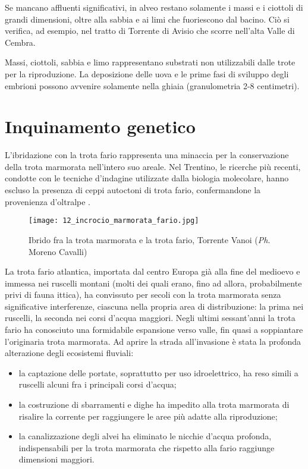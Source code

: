\documentclass[10pt,twoside,openany,x11names,svgnames,italian,a5paper,dvipsnames,table]{memoir}
\newcommand{\ph}{\emph{Ph}. }
\begin{document}
Se mancano affluenti significativi, in alveo restano solamente i massi e i ciottoli di grandi dimensioni, oltre alla sabbia e ai limi che fuoriescono dal bacino. Ciò si verifica, ad esempio, nel tratto di Torrente di Avisio che scorre nell’alta Valle di Cembra.


Massi, ciottoli, sabbia e limo rappresentano substrati non utilizzabili dalle trote per la riproduzione. La deposizione delle uova e le prime fasi di sviluppo degli embrioni possono avvenire solamente nella ghiaia (granulometria 2-8 centimetri).

\section{Inquinamento genetico}
L’ibridazione con la trota fario rappresenta una minaccia per la conservazione della trota marmorata nell’intero suo areale. Nel Trentino, le ricerche più recenti, condotte con le tecniche d’indagine utilizzate dalla biologia molecolare, hanno escluso la presenza di ceppi autoctoni di trota fario, confermandone la provenienza d’oltralpe \cite{Gandolfi91}.

\begin{wrapfigure}[15]{l}{.6\textwidth}
\begin{center}
\vspace{-.6cm}
\texttt{[image: 12\_incrocio\_marmorata\_fario.jpg]}
\caption*{Ibrido fra la trota marmorata e la trota fario, Torrente Vanoi (\ph Moreno Cavalli)}
\end{center}
\end{wrapfigure}

La trota fario atlantica, importata dal centro Europa già alla fine del medioevo e immessa nei ruscelli montani (molti dei quali erano, fino ad allora, probabilmente privi di fauna ittica), ha convissuto per secoli con la trota marmorata senza significative interferenze, ciascuna nella propria area di distribuzione: la prima nei ruscelli, la seconda nei corsi d’acqua maggiori. Negli ultimi sessant’anni la trota fario ha conosciuto una formidabile espansione verso valle, fin quasi a soppiantare l’originaria trota marmorata. 
Ad aprire la strada all'invasione è stata la profonda alterazione degli ecosistemi fluviali:
\begin{itemize}\itemsep0pt
  \item la captazione delle portate, soprattutto per uso idroelettrico, ha reso simili a ruscelli alcuni fra i principali corsi d’acqua; 
  \item la costruzione di sbarramenti e dighe ha impedito alla trota marmorata di risalire la corrente per raggiungere le aree più adatte alla riproduzione; 
  \item la canalizzazione degli alvei ha eliminato le nicchie d’acqua profonda, indispensabili per la trota marmorata che rispetto alla fario raggiunge dimensioni maggiori.
\end{itemize}
\end{document}
